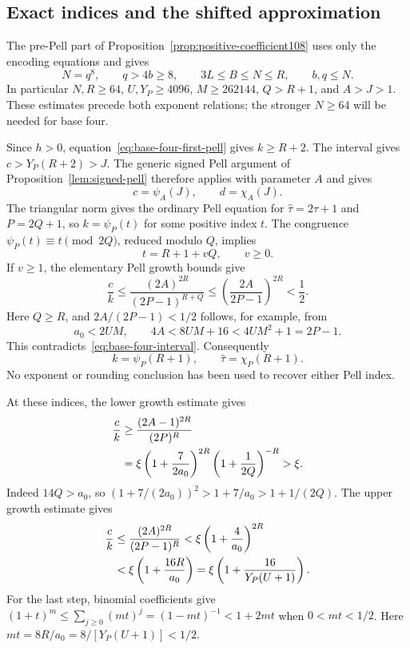 \subsection{Exact indices and the shifted approximation}

The pre-Pell part of Proposition~\ref{prop:positive-coefficient108}
uses only the encoding equations and gives
\[
 N=q^8,\qquad q>4b\ge8,\qquad
 3L\le B\le N\le R,\qquad b,q\le N.
\]
In particular $N,R\ge64$, $U,Y_P\ge4096$, $M\ge262144$,
$Q>R+1$, and $A>J>1$. These estimates precede both exponent
relations; the stronger $N\ge64$ will be needed for base four.

Since $h>0$, equation~\eqref{eq:base-four-first-pell} gives
$k\ge R+2$. The interval gives $c>Y_P(R+2)>J$.
The generic signed Pell argument of Proposition~\ref{lem:signed-pell}
therefore applies with parameter $A$ and gives
\begin{equation}\label{eq:base-four-main-index}
 c=\psi_A(J),\qquad d=\chi_A(J).
\end{equation}
The triangular norm gives the ordinary Pell equation for
$\widehat\tau=2\tau+1$ and $P=2Q+1$, so
$k=\psi_P(t)$ for some positive index $t$. The congruence
$\psi_P(t)\equiv t\pmod{2Q}$, reduced modulo $Q$, implies
\[
 t=R+1+vQ,\qquad v\ge0.
\]
If $v\ge1$, the elementary Pell growth bounds give
\[
 \frac ck\le
 \frac{(2A)^{2R}}{(2P-1)^{R+Q}}
 \le\left(\frac{2A}{2P-1}\right)^{2R}<\frac12.
\]
Here $Q\ge R$, and $2A/(2P-1)<1/2$ follows, for example, from
\[
 a_0<2UM,\qquad
 4A<8UM+16<4UM^2+1=2P-1.
\]
This contradicts~\eqref{eq:base-four-interval}. Consequently
\begin{equation}\label{eq:base-four-first-index}
 k=\psi_P(R+1),\qquad \widehat\tau=\chi_P(R+1).
\end{equation}
No exponent or rounding conclusion has been used to recover either
Pell index.

At these indices, the lower growth estimate gives
\begin{align}
 \frac ck
 &\ge\frac{(2A-1)^{2R}}{(2P)^R}\notag\\
 &=\xi\left(1+\frac7{2a_0}\right)^{2R}
          \left(1+\frac1{2Q}\right)^{-R}
 >\xi.\label{eq:base-four-lower}
\end{align}
Indeed $14Q>a_0$, so
$(1+7/(2a_0))^2>1+7/a_0>1+1/(2Q)$.
The upper growth estimate gives
\begin{align}
 \frac ck
 &\le\frac{(2A)^{2R}}{(2P-1)^R}
 <\xi\left(1+\frac4{a_0}\right)^{2R}\notag\\
 &<\xi\left(1+\frac{16R}{a_0}\right)
 =\xi\left(1+\frac{16}{Y_P(U+1)}\right).
 \label{eq:base-four-upper}
\end{align}
For the last step, binomial coefficients give
$(1+t)^m\le\sum_{j\ge0}(mt)^j=(1-mt)^{-1}<1+2mt$
when $0<mt<1/2$. Here $mt=8R/a_0=8/[Y_P(U+1)]<1/2$.

